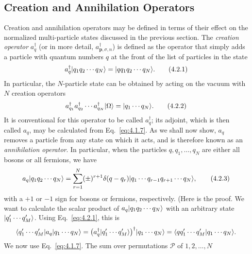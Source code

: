 
\subsection{Creation and Annihilation Operators}

Creation and annihilation operators may be defined in terms of their effect
on the normalized multi-particle states discussed in the previous section.
The \textit{creation operator} $a^\dagger_q$ (or in more detail, $a^\dagger_{\mathbf p,\sigma,n}$) is defined as the
operator that simply adds a particle with quantum numbers $q$ at the front
of the list of particles in the state
\begin{equation}
  a^\dagger_q\lvert q_1q_2\cdots q_N\rangle=\lvert q q_1q_2\cdots q_N\rangle.
  \tag{4.2.1}
  \label{eq:4.2.1}
\end{equation}
In particular, the $N$-particle state can be obtained by acting on the vacuum
with $N$ creation operators
\begin{equation}
  a^\dagger_{q_1}a^\dagger_{q_2}\cdots a^\dagger_{q_N}\lvert \Omega\rangle
  =\lvert q_1\cdots q_N\rangle.
  \tag{4.2.2}
  \label{eq:4.2.2}
\end{equation}
It is conventional for this operator to be called $a^\dagger_q$; its adjoint, which
is then called $a_q$, may be calculated from Eq.~\eqref{eq:4.1.7}. As we shall
now show, $a_q$ removes a particle from any state on which it acts, and
is therefore known as an \textit{annihilation operator}. In particular, when the
particles $q,q_1,\ldots,q_N$ are either all bosons or all fermions, we have
\begin{equation}
  a_q\lvert q_1q_2\cdots q_N\rangle
  =\sum_{r=1}^{N}(\pm)^{r+1}\delta(q-q_r)
    \lvert q_1\cdots q_{r-1}q_{r+1}\cdots q_N\rangle,
  \tag{4.2.3}
  \label{eq:4.2.3}
\end{equation}
with a $+1$ or $-1$ sign for bosons or fermions, respectively. (Here is the
proof. We want to calculate the scalar product of $a_q\lvert q_1q_2\cdots q_N\rangle$ with an
arbitrary state $\lvert q'_1\cdots q'_M\rangle$. Using Eq.~\eqref{eq:4.2.1}, this is
\[
  \langle q'_1\cdots q'_M\rvert a_q\lvert q_1\cdots q_N\rangle
  =\bigl(a^\dagger_q\lvert q'_1\cdots q'_M\rangle\bigr)^\dagger
    \lvert q_1\cdots q_N\rangle
  =\langle q q'_1\cdots q'_M | q_1\cdots q_N\rangle.
\]
We now use Eq.~\eqref{eq:4.1.7}. The sum over permutations $\mathcal P$ of $1,2,\ldots,N$
